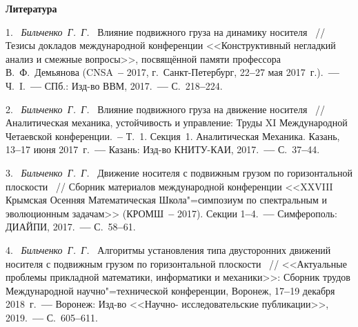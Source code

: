 \smallskip \centerline {\bf Литература} \nopagebreak



1.~%
\textit%
{Бильченко~Г.~Г.~}
{%
  {Влияние подвижного груза
 на динамику носителя}%
~/$\!$/
  Тезисы докладов международной конференции
  <<Конструктивный негладкий анализ
  и смежные вопросы>>,
  посвящённой памяти профессора
  В.~Ф.~Демьянова
  (CNSA~{\textbf{--}} 2017,
  г.~Санкт-Петербург,
  22{\textbf{--}}27
  мая 2017~г.).~{\textbf{---}}
  Ч.~I.~{\textbf{---}}
  СПб.: Изд-во ВВМ,
  2017.~{\textbf{---}}
  С.~218{\textbf{--}}224.%
  }



2.~%
\textit%
{Бильченко~Г.~Г.~}
{%
  {Влияние подвижного груза
  на движение носителя}%
~/$\!$/
  Аналитическая механика,
  устойчивость и управление:
  Труды XI Международной
  Четаевской конференции.~{\textbf{--}}
  Т.~1.
  Секция~1.
  Аналитическая Механика.
  Казань,
  13{\textbf{--}}17
  июня 2017~г.~{\textbf{---}}
  Казань: Изд-во КНИТУ-КАИ,
  2017.~{\textbf{---}}
  С.~37{\textbf{--}}44.%
  }



3.~%
\textit%
{Бильченко~Г.~Г.~}
{%
  {Движение носителя с подвижным грузом
  по горизонтальной плоскости}%
~/$\!$/
  Сборник материалов международной конференции
  <<XXVIII Крымская Осенняя
  Математическая Школа"=симпозиум
  по спектральным и эволюционным задачам>>
  (КРОМШ~{\textbf{--}} 2017).
  Секции
  1{\textbf{--}}4.~{\textbf{---}}
  Симферополь: ДИАЙПИ,
  2017.~{\textbf{---}}
  С.~58{\textbf{--}}61.%
  }



4.~%
\textit%
{Бильченко~Г.~Г.~}
{%
  {Алгоритмы
  установления типа
  двусторонних движений носителя
  с подвижным грузом
  по горизонтальной плоскости}%
~/$\!$/
  <<Актуальные проблемы
  прикладной математики, информатики
  и механики>>:
  Сборник трудов Международной
  научно"=технической конференции,
  Воронеж,
  17{\textbf{--}}19
  декабря 2018~г.~{\textbf{---}}
  Воронеж:
  Изд-во
  <<Научно-%
  ис\-сле\-до\-ва\-тель\-ские
  публикации>>,
  2019.~{\textbf{---}}
  С.~605{\textbf{--}}611.%
 }



